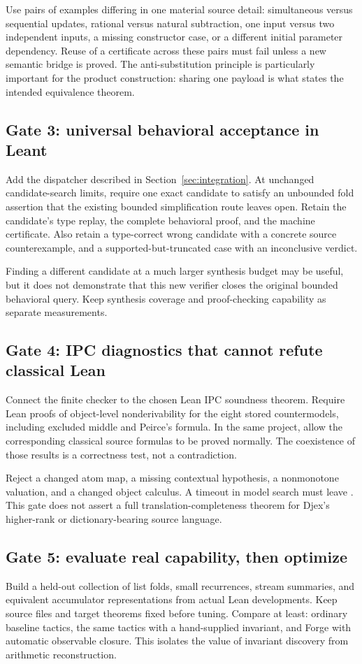Use pairs of examples differing in one material source detail: simultaneous
versus sequential updates, rational versus natural subtraction, one input versus
two independent inputs, a missing constructor case, or a different initial
parameter dependency. Reuse of a certificate across these pairs must fail
unless a new semantic bridge is proved. The anti-substitution principle is
particularly important for the product construction: sharing one payload is
what states the intended equivalence theorem.

\subsection{Gate 3: universal behavioral acceptance in Leant}
Add the dispatcher described in Section~\ref{sec:integration}. At unchanged
candidate-search limits, require one exact candidate to satisfy an unbounded
fold assertion that the existing bounded simplification route leaves open.
Retain the candidate's type replay, the complete behavioral proof, and the
machine certificate. Also retain a type-correct wrong candidate with a concrete
source counterexample, and a supported-but-truncated case with an inconclusive
verdict.

Finding a different candidate at a much larger synthesis budget may be useful,
but it does not demonstrate that this new verifier closes the original bounded
behavioral query. Keep synthesis coverage and proof-checking capability as
separate measurements.

\subsection{Gate 4: IPC diagnostics that cannot refute classical Lean}
Connect the finite checker to the chosen Lean IPC soundness theorem. Require
Lean proofs of object-level nonderivability for the eight stored countermodels,
including excluded middle and Peirce's formula. In the same project, allow the
corresponding classical source formulas to be proved normally. The coexistence
of those results is a correctness test, not a contradiction.

Reject a changed atom map, a missing contextual hypothesis, a nonmonotone
valuation, and a changed object calculus. A timeout in model search must leave
\unknown{}. This gate does not assert a full translation-completeness theorem
for Djex's higher-rank or dictionary-bearing source language.

\subsection{Gate 5: evaluate real capability, then optimize}
Build a held-out collection of list folds, small recurrences, stream summaries,
and equivalent accumulator representations from actual Lean developments.
Keep source files and target theorems fixed before tuning. Compare at least:
ordinary baseline tactics, the same tactics with a hand-supplied invariant,
and Forge with automatic observable closure. This isolates the value of
invariant discovery from arithmetic reconstruction.


